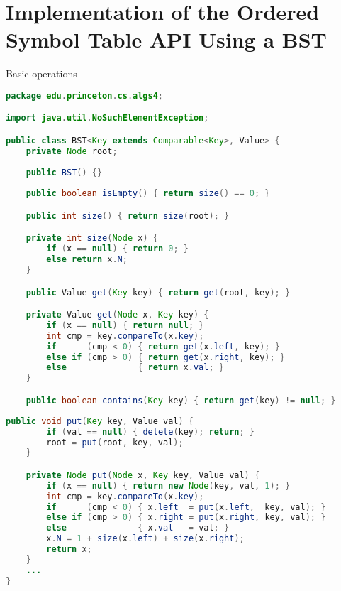 \documentclass[8pt,a4paper,compress]{beamer}
\begin{document}
\section{Implementation of the Ordered Symbol Table API Using a BST}
\begin{frame}[fragile]
Basic operations

\begin{lstlisting}[language=Java]
package edu.princeton.cs.algs4;

import java.util.NoSuchElementException;

public class BST<Key extends Comparable<Key>, Value> {
    private Node root;
    
    public BST() {}
    
    public boolean isEmpty() { return size() == 0; }

    public int size() { return size(root); }

    private int size(Node x) {
        if (x == null) { return 0; }
        else return x.N;
    }

    public Value get(Key key) { return get(root, key); }

    private Value get(Node x, Key key) {
        if (x == null) { return null; }
        int cmp = key.compareTo(x.key);
        if      (cmp < 0) { return get(x.left, key); }
        else if (cmp > 0) { return get(x.right, key); }
        else              { return x.val; }
    }

    public boolean contains(Key key) { return get(key) != null; }
\end{lstlisting}
\end{frame}

\begin{frame}[fragile]
\begin{lstlisting}[language=Java]
    public void put(Key key, Value val) {
        if (val == null) { delete(key); return; }
        root = put(root, key, val);
    }

    private Node put(Node x, Key key, Value val) {
        if (x == null) { return new Node(key, val, 1); }
        int cmp = key.compareTo(x.key);
        if      (cmp < 0) { x.left  = put(x.left,  key, val); }
        else if (cmp > 0) { x.right = put(x.right, key, val); }
        else              { x.val   = val; }
        x.N = 1 + size(x.left) + size(x.right);
        return x;
    }
    ...
}
\end{lstlisting}
\end{frame}
\end{document}
